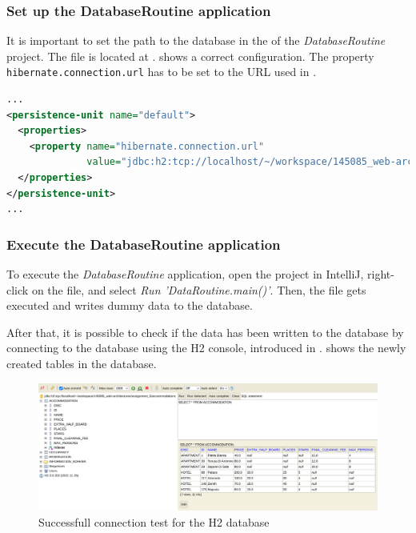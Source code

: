 \subsubsection{Set up the DatabaseRoutine application}\label{sec:03_depl_seeddb_setup}
It is important to set the path to the database in the  of the \textit{DatabaseRoutine} project. The  file is located at .  shows a correct configuration. The property \texttt{hibernate.connection.url} has to be set to the URL used in .
\begin{lstlisting}[label=lst:03_depl_seeddb_setup_config, caption=Default data source configuration, language=xml]
...
<persistence-unit name="default">
  <properties>
    <property name="hibernate.connection.url"
              value="jdbc:h2:tcp://localhost/~/workspace/145085_web-architectures/assignment_5/accommodations"/>
  </properties>
</persistence-unit>
...
\end{lstlisting}

\subsubsection{Execute the DatabaseRoutine application}\label{sec:03_depl_seeddb_executeroutine}
To execute the \textit{DatabaseRoutine} application, open the project in IntelliJ, right-click on the  file, and select \textit{Run 'DataRoutine.main()'}. Then, the file gets executed and writes dummy data to the database.

After that, it is possible to check if the data has been written to the database by connecting to the database using the H2 console, introduced in .  shows the newly created tables in the database.
\begin{figure}[h]
\centering
\includegraphics[scale=0.15]{images/03_depl/dummy-data}
\caption{Successfull connection test for the H2 database}
\label{fig:03_depl_seeddb_executeroutine_data}
\end{figure}


